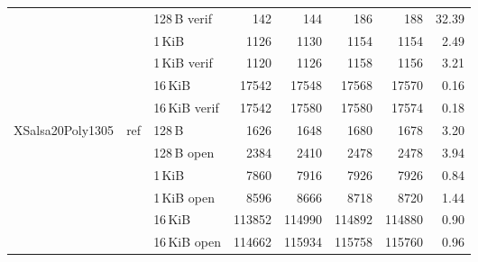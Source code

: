 \begin{table}[H]
\begin{tabular}{lllrrrrr}
 &     & 128\,B verif   & 142
                        & 144
                        & 186
                        & 188
                        & 32.39 \\

 &     & 1\,KiB         & 1126
                        & 1130
                        & 1154
                        & 1154
                        & 2.49 \\

 &     & 1\,KiB verif   & 1120
                        & 1126
                        & 1158
                        & 1156
                        & 3.21 \\

 &     & 16\,KiB        & 17542
                        & 17548
                        & 17568
                        & 17570
                        & 0.16 \\

 &     & 16\,KiB verif  & 17542
                        & 17580
                        & 17580
                        & 17574
                        & 0.18 \\

      \midrule
    \multirow{6}{*}{XSalsa20Poly1305}
 &  \multirow{6}{*}{ref}
       & 128\,B         & 1626
                        & 1648
                        & 1680
                        & 1678
                        & 3.20 \\

 &     & 128\,B open    & 2384
                        & 2410
                        & 2478
                        & 2478
                        & 3.94 \\

 &     & 1\,KiB         & 7860
                        & 7916
                        & 7926
                        & 7926
                        & 0.84 \\

 &     & 1\,KiB open    & 8596
                        & 8666
                        & 8718
                        & 8720
                        & 1.44 \\

 &     & 16\,KiB        & 113852
                        & 114990
                        & 114892
                        & 114880
                        & 0.90 \\

 &     & 16\,KiB open   & 114662
                        & 115934
                        & 115758
                        & 115760
                        & 0.96 \\


\end{tabular}
\end{table}
